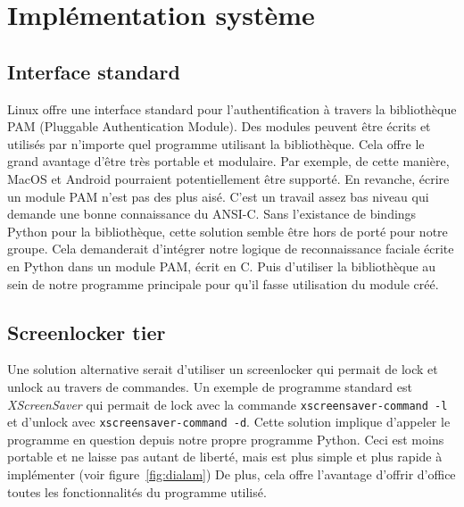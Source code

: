 \chapter{Implémentation système}
\newpage

\section{Interface standard}

Linux offre une interface standard pour l'authentification à travers la
bibliothèque PAM (Pluggable Authentication Module). Des modules peuvent être
écrits et utilisés par n'importe quel programme utilisant la bibliothèque.
Cela offre le grand avantage d'être très portable et modulaire. Par exemple, de
cette manière, MacOS et Android pourraient potentiellement être supporté.
En revanche, écrire un module PAM n'est pas des plus aisé. C'est un travail
assez bas niveau qui demande une bonne connaissance du ANSI-C.
Sans l'existance de bindings Python pour la bibliothèque, cette solution semble
être hors de porté pour notre groupe. Cela demanderait d'intégrer notre logique
de reconnaissance faciale écrite en Python dans un module PAM, écrit en C. Puis
d'utiliser la bibliothèque au sein de notre programme principale pour qu'il fasse
utilisation du module créé.

\section{Screenlocker tier}

Une solution alternative serait d'utiliser un screenlocker qui permait de lock
et unlock au travers de commandes. Un exemple de programme standard est
\mbox{\emph{XScreenSaver}} qui permait de lock avec la commande
\verb|xscreensaver-command -l| et d'unlock avec \verb|xscreensaver-command -d|.
Cette solution implique d'appeler le programme en question depuis notre propre
programme Python. Ceci est moins portable et ne laisse pas autant de liberté, mais
est plus simple et plus rapide à implémenter (voir figure~\ref{fig:dialam})
De plus, cela offre l'avantage d'offrir d'office toutes les fonctionnalités du
programme utilisé.
